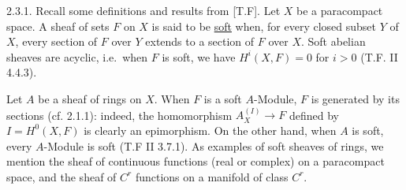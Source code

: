 2.3.1. Recall some definitions and results from [T.F]. Let $X$ be a paracompact space. A sheaf of sets $F$ on $X$ is said to be \uline{soft} when, for every closed subset $Y$ of $X$, every section of $F$ over $Y$ extends to a section of $F$ over $X$. Soft abelian sheaves are acyclic, i.e.\ when $F$ is soft, we have $H^i(X,F)=0$ for $i>0$ (T.F. II 4.4.3).

Let $A$ be a sheaf of rings on $X$. When $F$ is a soft $A$-Module, $F$ is generated by its sections (cf. 2.1.1): indeed, the homomorphism $A_X^{(I)}\to F$ defined by $I=H^0(X,F)$ is clearly an epimorphism.
%
On the other hand, when $A$ is soft, every $A$-Module is soft (T.F II 3.7.1). As examples of soft sheaves of rings, we mention the sheaf of continuous functions (real or complex) on a paracompact space, and the sheaf of $C^r$ functions on a manifold of class $C^r$.

